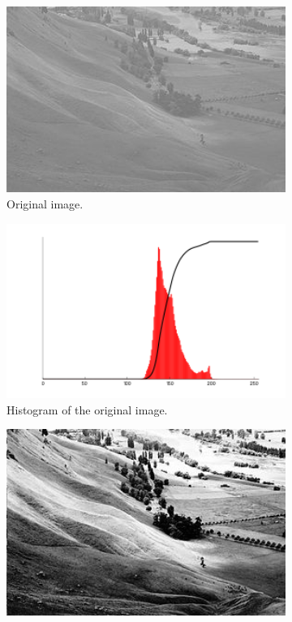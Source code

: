 \documentclass[conference]{IEEEtran}
\begin{document}
\begin{figure}[htbp]
    \centering
    \begin{subfigure}{0.4\textwidth}
        \centering
        \includegraphics[width=1\textwidth]{Images/C original.jpg}
        \caption{Original image.}
        \label{C original}
    \end{subfigure}
    \begin{subfigure}{0.4\textwidth}
        \centering
        \includegraphics[width=1\textwidth]{Images/C original histogram.png}
        \caption{Histogram of the original image.}
        \label{C original histogram}
    \end{subfigure}
    \begin{subfigure}{0.4\textwidth}
        \centering
        \includegraphics[width=1\textwidth]{Images/C equalised.jpg}

\end{subfigure}
\end{figure}
\end{document}
